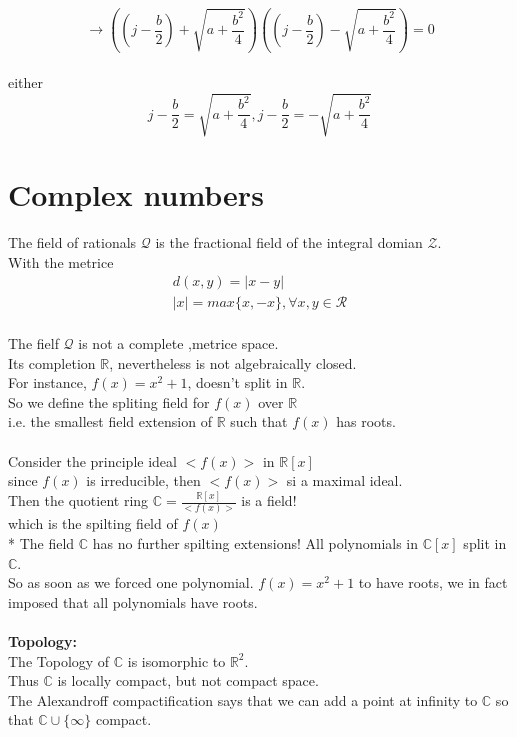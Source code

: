 $$ \rightarrow ((j-\frac{b}{2})+\sqrt{a+\frac{b^2}{4}})((j-\frac{b}{2})-\sqrt{a+\frac{b^2}{4}})=0$$ 
\\either $$ j-\frac{b}{2}=\sqrt{a+\frac{b^2}{4}} ,j-\frac{b}{2}=-\sqrt{a+\frac{b^2}{4}}$$ 

\section[Recitation 1(02-07)]{Complex numbers}
The field of rationals $ \mathcal{Q} $ is the fractional field of the integral domian $ \mathcal{Z} $.
\\With the metrice \begin{align*}{}{}
d(x,y)=|x-y|
\\|x|=max\{x,-x\}, \forall x, y \in \mathcal{R}
\end{align*}
\\The fielf $\mathcal{Q}$ is not a complete ,metrice space.
\\Its completion $\mathbb{R}$, nevertheless is not algebraically closed.
\\For instance, $ f(x)=x^2+1 $, doesn't split in $ \mathbb{R} $.
\\So we define the spliting field for $ f(x) $ over $ \mathbb{R} $ 
\\i.e. the smallest field extension of $ \mathbb{R} $ such that $ f(x) $ has roots.
\\
\\Consider the principle ideal $ <f(x)> $ in $ \mathbb{R}[x] $ 
\\since $ f(x) $ is irreducible, then $ <f(x)> $ si a maximal ideal.
\\Then the quotient ring $ \mathbb{C}=\frac{\mathbb{R}[x]}{<f(x)>} $  is a field!   
\\which is the spilting field of $f(x)$
\\* The field $ \mathbb{C} $ has no further spilting extensions! All polynomials in $ \mathbb{C}[x] $ split in $ \mathbb{C} $.
\\So as soon as we forced one polynomial. $ f(x)=x^2+1 $ to have roots, we in fact imposed that all polynomials have roots.
\\
\\\textbf{Topology:}
\\ The Topology of $ \mathbb{C} $ is isomorphic to $ \mathbb{R}^2 $. 
\\Thus $ \mathbb{C} $ is locally compact, but not compact space.
\\The Alexandroff compactification says that we can add a point at infinity to $ \mathbb{C} $ so that $ \mathbb{C}\cup\{\infty\} $  compact.
